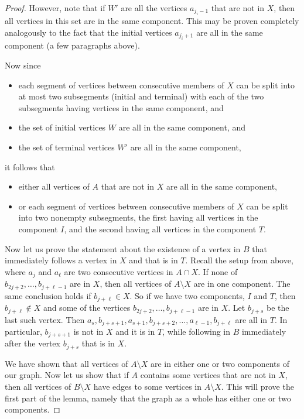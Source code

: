 \documentclass[11pt,a4paper]{article}
\begin{document}
\begin{proof}
However, note that if $W'$ are all the vertices $a_{j_i -1}$ that are not in $X$, then all vertices in this set are in the same component. This may be proven completely analogously to the fact that the initial vertices $a_{j_i +1}$ are all in the same component (a few paragraphs above).

Now since
\begin{itemize}
 \item each segment of vertices between consecutive members of $X$ can be split into at most two subsegments (initial and terminal) with each of the two subsegments having vertices in the same component, and
 \item the set of initial vertices $W$ are all in the same component, and
 \item the set of terminal vertices $W'$ are all in the same component,
\end{itemize}
it follows that
\begin{itemize}
 \item either all vertices of $A$ that are not in $X$ are all in the same component,
 \item or each segment of vertices between consecutive members of $X$ can be split into two nonempty subsegments, the first having all vertices in the component $I$, and the second having all vertices in the component $T$.
\end{itemize}

Now let us prove the statement about the existence of a vertex in $B$ that immediately follows a vertex in $X$ and that is in $T$. Recall the setup from above, where $a_j$ and $a_{\ell}$ are two consecutive vertices in $A\cap X$. If none of $b_{2j+2},\dots,b_{j+\ell-1}$ are in $X$, then all vertices of $A\setminus X$ are in one component. The same conclusion holds if $b_{j+\ell} \in X$. So if we have two components, $I$ and $T$, then $b_{j+\ell}\not\in X$ and some of the vertices $b_{2j+2},\dots,b_{j+\ell -1}$ are in $X$. Let $b_{j+s}$ be the last such vertex. Then $a_s,b_{j+s+1},a_{s+1},b_{j+s+2},\dots,a_{\ell -1},b_{j+\ell}$ are all in $T$. In particular, $b_{j+s+1}$ is not in $X$ and it is in $T$, while following in $B$ immediately after the vertex $b_{j+s}$ that is in $X$.

We have shown that all vertices of $A\setminus X$ are in either one or two components of our graph. Now let us show that if $A$ contains some vertices that are not in $X$, then all vertices of $B\setminus X$ have edges to some vertices in $A\setminus X$. This will prove the first part of the lemma, namely that the graph as a whole has either one or two components.


\end{proof}
\end{document}
